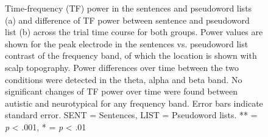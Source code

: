 \begin{figure}[!ht]
    \vspace{10pt}
	\centering
	\caption{Time-frequency (TF) power in the sentences and pseudoword lists (a) and difference of TF power between sentence and pseudoword list (b) across the trial time course for both groups. Power values are shown for the peak electrode in the sentences vs. pseudoword list contrast of the frequency band, of which the location is shown with scalp topography. Power differences over time between the two conditions were detected in the theta, alpha and beta band. No significant changes of TF power over time were found between autistic and neurotypical for any frequency band. Error bars indicate standard error. SENT = Sentences, LIST = Pseudoword lists. ** = \textit{p} < .001, * = \textit{p} < .01}
    \vspace*{-10pt}
	\label{fig:tf-dynamics-peak}
\end{figure}


